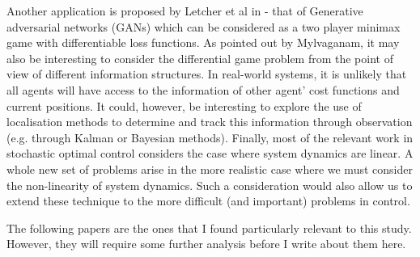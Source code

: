\documentclass[preprint,11pt]{report}
\begin{document}
Another application is proposed by Letcher et al in \cite{Letcher2019DifferentiableMechanics} - that
of Generative adversarial networks (GANs) which can be considered as a two player minimax game with
differentiable loss functions. As pointed out by Mylvaganam, it may also be interesting to consider
the differential game problem from the point of view of different information structures. In
real-world systems, it is unlikely that all agents will have access to the information of other
agent' cost functions and current positions. It could, however, be interesting to explore the use of
localisation methods to determine and track this information through observation (e.g. through
Kalman or Bayesian methods). Finally, most of the relevant work in stochastic optimal control
considers the case where system dynamics are linear. A whole new set of problems arise in the more
realistic case where we must consider the non-linearity of system dynamics. Such a consideration
would also allow us to extend these technique to the more difficult (and important) problems in
control.

The following papers \cite{Bailey2019FiniteDescent-Ascent, Bailey2019Multi-AgentSystem,
Boone2019FromTheory, DickensTheLearning, Berkenkamp2017SafeGuarantees,
Jin2018Stability-certifiedPerspective, Letcher2019DifferentiableMechanics} are the ones that I found
particularly relevant to this study. However, they will require some further analysis before I write
about them here.


 


\end{document}
